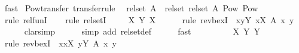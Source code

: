 \begin{isabellebody}
\ fast%
\endisatagproof
{\isafoldproof}%
%
\isadelimproof
\isanewline
%
\endisadelimproof
\isanewline
{}\isamarkupfalse%
\ Pow{\isacharunderscore}{\kern0pt}transfer\ {\isacharbrackleft}{\kern0pt}transfer{\isacharunderscore}{\kern0pt}rule{\isacharbrackright}{\kern0pt}{\isacharcolon}{\kern0pt}\isanewline
\ \ {\isachardoublequoteopen}{\isacharparenleft}{\kern0pt}rel{\isacharunderscore}{\kern0pt}set\ A\ {\isacharequal}{\kern0pt}{\isacharequal}{\kern0pt}{\isacharequal}{\kern0pt}{\isachargreater}{\kern0pt}\ rel{\isacharunderscore}{\kern0pt}set\ {\isacharparenleft}{\kern0pt}rel{\isacharunderscore}{\kern0pt}set\ A{\isacharparenright}{\kern0pt}{\isacharparenright}{\kern0pt}\ Pow\ Pow{\isachardoublequoteclose}\isanewline
%
\isadelimproof
\ \ %
\endisadelimproof
%
\isatagproof
{}\isamarkupfalse%
\ {\isacharparenleft}{\kern0pt}rule\ rel{\isacharunderscore}{\kern0pt}funI{\isacharparenright}{\kern0pt}\isanewline
\ \ \isamarkupfalse%
\ {\isacharparenleft}{\kern0pt}rule\ rel{\isacharunderscore}{\kern0pt}setI{\isacharparenright}{\kern0pt}\isanewline
\ \ \isamarkupfalse%
\ \ X\ Y\ X{\isacharprime}{\kern0pt}\isanewline
\ \ \ \ \isamarkupfalse%
\ {\isacharparenleft}{\kern0pt}rule\ rev{\isacharunderscore}{\kern0pt}bexI\ {\isacharbrackleft}{\kern0pt}\ x{\isacharequal}{\kern0pt}{\isachardoublequoteopen}{\isacharbraceleft}{\kern0pt}y{\isasymin}Y{\isachardot}{\kern0pt}\ {\isasymexists}x{\isasymin}X{\isacharprime}{\kern0pt}{\isachardot}{\kern0pt}\ A\ x\ y{\isacharbraceright}{\kern0pt}{\isachardoublequoteclose}{\isacharbrackright}{\kern0pt}{\isacharparenright}{\kern0pt}\isanewline
\ \ \ \ \isamarkupfalse%
\ clarsimp\isanewline
\ \ \ \ \isamarkupfalse%
\ {\isacharparenleft}{\kern0pt}simp\ add{\isacharcolon}{\kern0pt}\ rel{\isacharunderscore}{\kern0pt}set{\isacharunderscore}{\kern0pt}def{\isacharparenright}{\kern0pt}\isanewline
\ \ \ \ \isamarkupfalse%
\ fast\isanewline
\ \ \ \ \isamarkupfalse%
\isanewline
\ \ \isamarkupfalse%
\ \ X\ Y\ Y{\isacharprime}{\kern0pt}\isanewline
\ \ \ \ \isamarkupfalse%
\ {\isacharparenleft}{\kern0pt}rule\ rev{\isacharunderscore}{\kern0pt}bexI\ {\isacharbrackleft}{\kern0pt}\ x{\isacharequal}{\kern0pt}{\isachardoublequoteopen}{\isacharbraceleft}{\kern0pt}x{\isasymin}X{\isachardot}{\kern0pt}\ {\isasymexists}y{\isasymin}Y{\isacharprime}{\kern0pt}{\isachardot}{\kern0pt}\ A\ x\ y{\isacharbraceright}{\kern0pt}{\isachardoublequoteclose}{\isacharbrackright}{\kern0pt}{\isacharparenright}{\kern0pt}\isanewline

\end{isabellebody}
